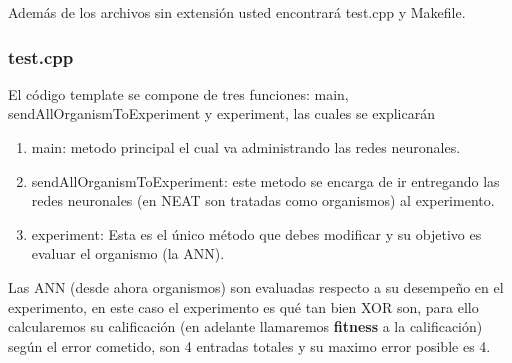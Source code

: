 Además de los archivos sin extensión usted encontrará test.cpp y Makefile.

\subsubsection{test.cpp}

El código template se compone de tres funciones: main, sendAllOrganismToExperiment y experiment, las cuales se explicarán 

\begin{enumerate}
\item main: metodo principal el cual va administrando las redes neuronales.
\item sendAllOrganismToExperiment: este metodo se encarga de ir entregando las redes neuronales (en NEAT son tratadas como organismos) al experimento.
\item experiment: Esta es el único método que debes modificar y su objetivo es evaluar el organismo (la ANN).
\end{enumerate}


Las ANN (desde ahora organismos) son evaluadas respecto a su desempeño en el experimento, en este caso el experimento es qué tan bien XOR son, para ello calcularemos su calificación (en adelante llamaremos \textbf{fitness} a la calificación) según el error cometido, son 4 entradas totales y su maximo error posible es 4. 


